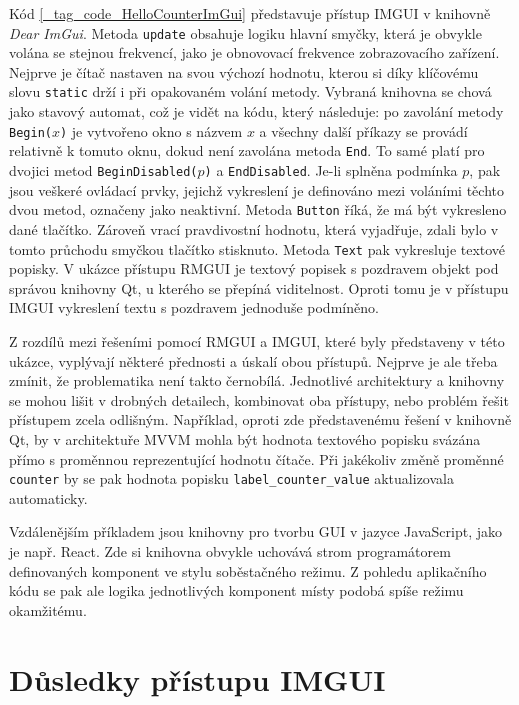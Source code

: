 \documentclass[FM,DP]{tulthesis}
\begin{document}
	Kód \ref{_tag_code_HelloCounterImGui} představuje přístup IMGUI v knihovně \textit{Dear ImGui}. Metoda \texttt{update} obsahuje logiku hlavní smyčky, která je obvykle volána se stejnou frekvencí, jako je obnovovací frekvence zobrazovacího zařízení. Nejprve je čítač nastaven na svou výchozí hodnotu, kterou si díky klíčovému slovu \texttt{static} drží i při opakovaném volání metody. Vybraná knihovna se chová jako stavový automat, což je vidět na kódu, který následuje: po zavolání metody \texttt{Begin($x$)} je vytvořeno okno s názvem $x$ a všechny další příkazy se provádí relativně k tomuto oknu, dokud není zavolána metoda \texttt{End}. To samé platí pro dvojici metod \texttt{BeginDisabled($p$)} a \texttt{EndDisabled}. Je-li  splněna podmínka $p$, pak jsou veškeré ovládací prvky, jejichž vykreslení je definováno mezi voláními těchto dvou metod, označeny jako neaktivní. Metoda \texttt{Button} říká, že má být vykresleno dané tlačítko. Zároveň vrací pravdivostní hodnotu, která vyjadřuje, zdali bylo v tomto průchodu smyčkou tlačítko stisknuto. Metoda \texttt{Text} pak vykresluje textové popisky. V ukázce přístupu RMGUI je textový popisek s pozdravem objekt pod správou knihovny Qt, u kterého se přepíná viditelnost. Oproti tomu je v přístupu IMGUI vykreslení textu s pozdravem jednoduše podmíněno.
	
	Z rozdílů mezi řešeními pomocí RMGUI a IMGUI, které byly představeny v této ukázce, vyplývají některé přednosti a úskalí obou přístupů. Nejprve je ale třeba zmínit, že problematika není takto černobílá. Jednotlivé architektury a knihovny se mohou lišit v drobných detailech, kombinovat oba přístupy, nebo problém řešit přístupem zcela odlišným. Například, oproti zde představenému řešení v knihovně Qt, by v architektuře MVVM mohla být hodnota textového popisku svázána přímo s proměnnou reprezentující hodnotu čítače. Při jakékoliv změně proměnné \texttt{counter} by se pak hodnota popisku \texttt{label\_counter\_value} aktualizovala automaticky.
	
	Vzdálenějším příkladem jsou knihovny pro tvorbu GUI v jazyce JavaScript, jako je např. React. Zde si knihovna obvykle uchovává strom programátorem definovaných komponent ve stylu soběstačného režimu. Z pohledu aplikačního kódu se pak ale logika jednotlivých komponent místy podobá spíše režimu okamžitému. \cite{online_hybridui}
	
	\section{Důsledky přístupu IMGUI}
	
\end{document}
